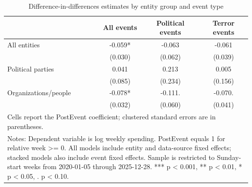 \begin{table}[!htbp]
\centering
\caption{Difference-in-differences estimates by entity group and event type}
\label{tab:did_key_results_post_from_0}
\begin{tabular}{lccc}
\hline\hline
 & All events & Political events & Terror events \\
\hline
All entities & -0.059* & -0.063 & -0.061 \\
 & (0.030) & (0.062) & (0.039) \\
Political parties & 0.041 & 0.213 & 0.005 \\
 & (0.085) & (0.234) & (0.156) \\
Organizations/people & -0.078* & -0.111. & -0.070. \\
 & (0.032) & (0.060) & (0.041) \\
\hline
\multicolumn{4}{l}{\footnotesize Cells report the PostEvent coefficient; clustered standard errors are in parentheses.}\\
\multicolumn{4}{l}{\footnotesize Notes: Dependent variable is log weekly spending. PostEvent equals 1 for relative week >= 0. All models include entity and data-source fixed effects; stacked models also include event fixed effects. Sample is restricted to Sunday-start weeks from 2020-01-05 through 2025-12-28. *** p < 0.001, ** p < 0.01, * p < 0.05, . p < 0.10.}\\
\hline\hline
\end{tabular}
\end{table}
